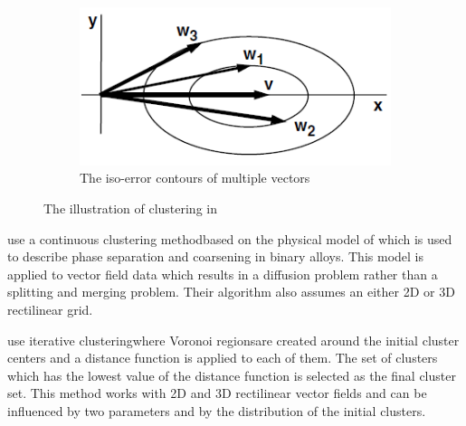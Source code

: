 \begin{figure}[h]
\begin{subfigure}{0.3\textwidth}
    \includegraphics[width=\textwidth]{./img/telea-ellipse-vectors.PNG}
    \caption{The iso-error contours of multiple vectors}
	\end{subfigure}
\caption[The illustration of clustering in \citet{Telea99}]{The illustration of clustering in \citet{Telea99}}
\label{fig:telea-hierarchical_clustering}
\end{figure}

\citet{Garcke00} use a continuous clustering method\footnotemark based on the physical model of \citet{CahnHilliard58} which is used to describe phase separation and coarsening in binary alloys. This model is applied to vector field data which results in a diffusion problem rather than a splitting and merging problem. Their algorithm also assumes an either 2D or 3D rectilinear grid.


\citet{Du04} use iterative clustering\footnotemark where Voronoi regions\footnotemark are created around the initial cluster centers and a distance function is applied to each of them. The set of clusters which has the lowest value of the distance function is selected as the final cluster set. This method works with 2D and 3D rectilinear vector fields and can be influenced by two parameters and by the distribution of the initial clusters.

\addtocounter{footnote}{-2}

